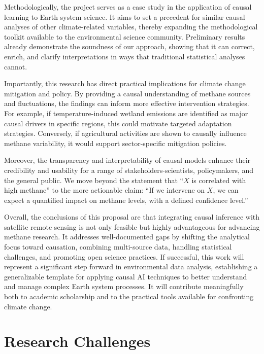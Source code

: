 Methodologically, the project serves as a case study in the application of causal learning to Earth system science. It aims to set a precedent for similar causal analyses of other climate-related variables, thereby expanding the methodological toolkit available to the environmental science community. Preliminary results already demonstrate the soundness of our approach, showing that it can correct, enrich, and clarify interpretations in ways that traditional statistical analyses cannot.

Importantly, this research has direct practical implications for climate change mitigation and policy. By providing a causal understanding of methane sources and fluctuations, the findings can inform more effective intervention strategies. For example, if temperature-induced wetland emissions are identified as major causal drivers in specific regions, this could motivate targeted adaptation strategies. Conversely, if agricultural activities are shown to causally influence methane variability, it would support sector-specific mitigation policies.

Moreover, the transparency and interpretability of causal models enhance their credibility and usability for a range of stakeholders-scientists, policymakers, and the general public. We move beyond the statement that ``$X$ is correlated with high methane'' to the more actionable claim: ``If we intervene on $X$, we can expect a quantified impact on methane levels, with a defined confidence level.''

Overall, the conclusions of this proposal are that integrating causal inference with satellite remote sensing is not only feasible but highly advantageous for advancing methane research. It addresses well-documented gaps by shifting the analytical focus toward causation, combining multi-source data, handling statistical challenges, and promoting open science practices. If successful, this work will represent a significant step forward in environmental data analysis, establishing a generalizable template for applying causal AI techniques to better understand and manage complex Earth system processes. It will contribute meaningfully both to academic scholarship and to the practical tools available for confronting climate change.


\section{Research Challenges}

